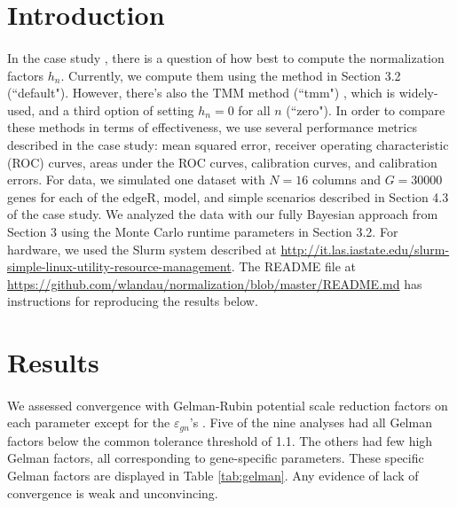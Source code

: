 \documentclass{article}
\begin{document}
\begin{flushleft}

\section{Introduction}

\paragraph{} In the case study \cite{thesispaper2}, there is a question of how best to compute the normalization factors $h_n$. Currently, we compute them using the method in Section 3.2 (``default"). However, there's also the TMM method (``tmm") \cite{robinson2010scaling}, which is widely-used, and a third option of setting $h_n = 0$ for all $n$ (``zero"). In order to compare these methods in terms of effectiveness, we use several performance metrics described in the case study: mean squared error, receiver operating characteristic (ROC) curves, areas under the ROC curves, calibration curves, and calibration errors. For data, we simulated one dataset with $N = 16$ columns and $G = 30000$ genes for each of the edgeR, model, and simple scenarios described in Section 4.3 of the case study. We analyzed the data with our fully Bayesian approach from Section 3 using the Monte Carlo runtime parameters in Section 3.2. For hardware, we used the Slurm system described at \url{http://it.las.iastate.edu/slurm-simple-linux-utility-resource-management}. The README file at \url{https://github.com/wlandau/normalization/blob/master/README.md} has instructions for reproducing the results below.

\section{Results} \label{sec:results}

\paragraph{} We assessed convergence with Gelman-Rubin potential scale reduction factors on each parameter except for the $\varepsilon_{gn}$'s \cite{bda}. Five of the nine analyses had all Gelman factors below the common tolerance threshold of 1.1. The others had few high Gelman factors, all corresponding to gene-specific parameters. These specific Gelman factors are displayed in Table \ref{tab:gelman}. Any evidence of lack of convergence is weak and unconvincing.


\end{flushleft}
\end{document}
